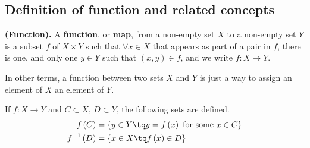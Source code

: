 \subsection{Definition of function and related concepts}
\begin{definition}
    \textbf{(Function).} A \textbf{function}, or \textbf{map}, from a non-empty set $X$ to a non-empty set $Y$ is a subset $f$ of $X\times Y$ such that $\forall x\in X$ that appears as part of a pair in $f$, there is one, and only one $y\in Y$ such that $\left( x, y \right)\in f$, and we write $f:X\to Y$.
\end{definition}

In other terms, a function between two sets $X$ and $Y$ is just a way to assign an element of $X$ an element of $Y$.


\begin{definition}
    If $f:X\to Y$ and $C\subset X$, $D\subset Y$, the following sets are defined.
    \begin{align}
        f\left( C \right) &= \{y\in Y\tq y = f\left( x \right) \textrm{ for some } x\in C\} \\
        f^{-1}\left( D \right) &= \{x\in X\tq f\left( x \right) \in D\} 
    \end{align}
\end{definition}

